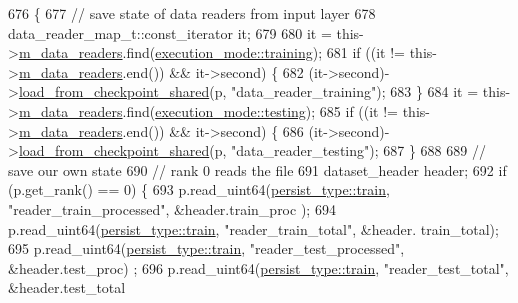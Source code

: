 \begin{DoxyCode}
676                                                         \{
677     \textcolor{comment}{// save state of data readers from input layer}
678     data\_reader\_map\_t::const\_iterator it;
679 
680     it = this->\hyperlink{classlbann_1_1generic__input__layer_a6bc18860c02beed0252ea3cc87bc48d2}{m\_data\_readers}.find(\hyperlink{base_8hpp_a2781a159088df64ed7d47cc91c4dc0a8ac185ddac8b5a8f5aa23c5b80bc12d214}{execution\_mode::training});
681     \textcolor{keywordflow}{if} ((it != this->\hyperlink{classlbann_1_1generic__input__layer_a6bc18860c02beed0252ea3cc87bc48d2}{m\_data\_readers}.end()) && it->second) \{
682       (it->second)->\hyperlink{classlbann_1_1generic__input__layer_ae5a542333eaf447a05fc586848e7c94c}{load\_from\_checkpoint\_shared}(p, \textcolor{stringliteral}{"data\_reader\_training"});
683     \}
684     it = this->\hyperlink{classlbann_1_1generic__input__layer_a6bc18860c02beed0252ea3cc87bc48d2}{m\_data\_readers}.find(\hyperlink{base_8hpp_a2781a159088df64ed7d47cc91c4dc0a8aae2b1fca515949e5d54fb22b8ed95575}{execution\_mode::testing});
685     \textcolor{keywordflow}{if} ((it != this->\hyperlink{classlbann_1_1generic__input__layer_a6bc18860c02beed0252ea3cc87bc48d2}{m\_data\_readers}.end()) && it->second) \{
686       (it->second)->\hyperlink{classlbann_1_1generic__input__layer_ae5a542333eaf447a05fc586848e7c94c}{load\_from\_checkpoint\_shared}(p, \textcolor{stringliteral}{"data\_reader\_testing"});
687     \}
688 
689     \textcolor{comment}{// save our own state}
690     \textcolor{comment}{// rank 0 reads the file}
691     dataset\_header header;
692     \textcolor{keywordflow}{if} (p.get\_rank() == 0) \{
693       p.read\_uint64(\hyperlink{namespacelbann_adee41f31f15f3906cbdcce4a1417eb56a61b3a8faa9c1091806675c230a9abe64}{persist\_type::train}, \textcolor{stringliteral}{"reader\_train\_processed"},    &header.train\_proc
      );
694       p.read\_uint64(\hyperlink{namespacelbann_adee41f31f15f3906cbdcce4a1417eb56a61b3a8faa9c1091806675c230a9abe64}{persist\_type::train}, \textcolor{stringliteral}{"reader\_train\_total"},        &header.
      train\_total);
695       p.read\_uint64(\hyperlink{namespacelbann_adee41f31f15f3906cbdcce4a1417eb56a61b3a8faa9c1091806675c230a9abe64}{persist\_type::train}, \textcolor{stringliteral}{"reader\_test\_processed"},     &header.test\_proc)
      ;
696       p.read\_uint64(\hyperlink{namespacelbann_adee41f31f15f3906cbdcce4a1417eb56a61b3a8faa9c1091806675c230a9abe64}{persist\_type::train}, \textcolor{stringliteral}{"reader\_test\_total"},         &header.test\_total

\end{DoxyCode}
